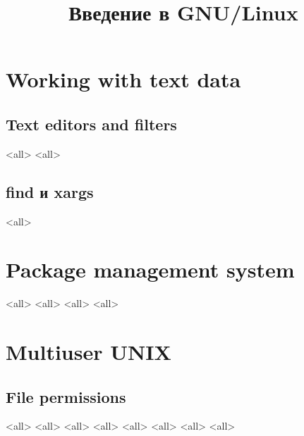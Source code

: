

\title{Введение в GNU/Linux}








\begin{frame}
	\frametitle{}
	\titlepage
	\vspace{-0.5cm}
	\begin{center}
	\end{center}
\end{frame}





\section{Working with text data}

\subsection{Text editors and filters}
\mode<all>{}
\mode<all>{} %
\subsection{find и xargs}
\mode<all>{}

\section{Package management system}
\mode<all>{}
\mode<all>{}
\mode<all>{}
\mode<all>{}


\section{Multiuser UNIX}
\subsection{File permissions}
\mode<all>{}
\mode<all>{}
\mode<all>{}
\mode<all>{}
\mode<all>{}
\mode<all>{}
\mode<all>{}
\mode<all>{}

